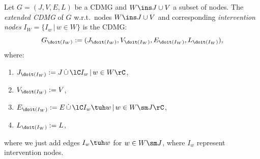 \begin{Def}
  Let $G=(J,V,E,L)$ be a CDMG and $W \ins J \cup V$ a subset of nodes.
  The \emph{extended CDMG} of $G$ w.r.t.\ nodes $W \ins J \cup V$  and corresponding \emph{intervention nodes} 
  $I_W = \{I_w \,|\, w \in W\}$ %
  is the CDMG: 
  \[ G_{\doit(I_W)}:=(J_{\doit(I_W)},V_{\doit(I_W)},E_{\doit(I_W)},L_{\doit(I_W)}),\]
  where:
  \begin{enumerate}[label=\roman*.)]
      \item $J_{\doit(I_W)}:= J\, \dot{\cup} \, \lC I_w\,|\, w \in W \rC$, %
      \item $V_{\doit(I_W)}:= V$,
      \item $E_{\doit(I_W)}:= E\, \dot{\cup} \, \lC I_w \tuh w \,|\, w \in W\sm J \rC$,
      \item $L_{\doit(I_W)}:= L$,
  \end{enumerate}
  where we just add edges $I_w \tuh w$ for $ w \in W \sm J$, where $I_w$ represent intervention nodes.

\end{Def}
